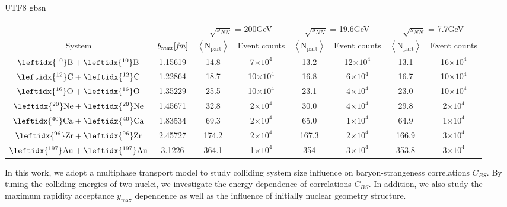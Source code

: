 \documentclass[twocolumn,showpacs,preprintnumbers,amsmath,amssymb]{revtex4-1}
\begin{document}
\begin{CJK*} {UTF8} {gbsn}
\begin{table*}[]
	\begin{tabular}{cc|cc|cc|cc}
\toprule
\multicolumn{2}{c}{} & \multicolumn{2}{c}{$\sqrt{s_{NN}}$ = 200GeV} & \multicolumn{2}{c}{$\sqrt{s_{NN}}$ = 19.6GeV} & \multicolumn{2}{c}{$\sqrt{s_{NN}}$ = 7.7GeV} \\
\cmidrule(r){3-4} \cmidrule(r){5-6} \cmidrule(r){7-8}
System & $\mathrm{\it{b_{max}}[\it{fm}]}$
&$\left\langle \mathrm{N_{part}}\right\rangle$ &Event counts
&$\left\langle \mathrm{N_{part}}\right\rangle$ &Event counts
&$\left\langle \mathrm{N_{part}}\right\rangle$ &Event counts      \\
\hline
$\mathrm{\leftidx{^{10}}B} + \mathrm{\leftidx{^{10}}B}$		&1.15619		&14.8  &7$\times 10^{4}$    	&13.2  &12$\times 10^{4}$  &13.1  &16$\times 10^{4}$\\
$\mathrm{\leftidx{^{12}}C} + \mathrm{\leftidx{^{12}}C}$		&1.22864		&18.7  &10$\times 10^{4}$    	&16.8  &6$\times 10^{4}$ 	&16.7  &10$\times 10^{4}$\\
$\mathrm{\leftidx{^{16}}O}+\mathrm{\leftidx{^{16}}O}$		&1.35229		&25.5   &10$\times 10^{4}$	&23.1  &4$\times 10^{4}$	&23.0  &10$\times 10^{4}$ \\
$\mathrm{\leftidx{^{20}}Ne}+\mathrm{\leftidx{^{20}}Ne}$		&1.45671		&32.8  &2$\times 10^{4}$	&30.0  &4$\times 10^{4}$	&29.8  &2$\times 10^{4}$\\
$\mathrm{\leftidx{^{40}}Ca}+\mathrm{\leftidx{^{40}}Ca}$		&1.83534		&69.3  &2$\times 10^{4}$	&65.0  &1$\times 10^{4}$	&64.9  &1$\times 10^{4}$ \\
$\mathrm{\leftidx{^{96}}Zr}+\mathrm{\leftidx{^{96}}Zr}$ 		&2.45727		&174.2 &2$\times 10^{4}$	&167.3  &2$\times 10^{4}$	&166.9 &3$\times 10^{4}$\\
$\mathrm{\leftidx{^{197}}Au}+\mathrm{\leftidx{^{197}}Au}$		&3.1226		&364.1 &1$\times 10^{4}$	&354  &3$\times 10^{4}$	&353.8  &3$\times 10^{4}$\\
\bottomrule
\end{tabular}
\end{table*}
	
		
	
	\par
	In this work, we adopt a multiphase transport model to study colliding system size influence on baryon-strangeness correlations $C_{BS}$.
	By tuning the colliding energies of two nuclei, we investigate the energy dependence of correlations $C_{BS}$.
		In addition, we also study the maximum rapidity acceptance $y_{\text{max}}$ dependence as well as the influence of initially nuclear geometry structure.
	

\end{CJK*}
\end{document}
